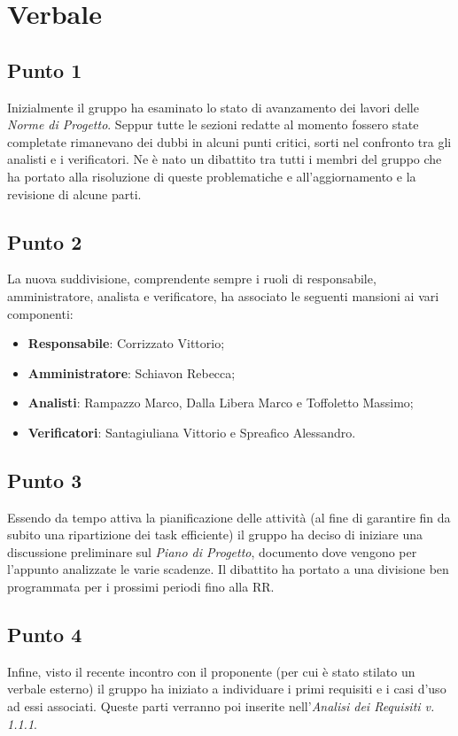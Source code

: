 \section{Verbale}
    \subsection{Punto 1}
        Inizialmente il gruppo ha esaminato lo stato di avanzamento dei lavori delle \textit{Norme di Progetto}. Seppur tutte le sezioni redatte al momento fossero state completate rimanevano dei dubbi in alcuni punti critici, sorti nel confronto tra gli analisti e i verificatori. Ne è nato un dibattito tra tutti i membri del gruppo che ha portato alla risoluzione di queste problematiche e all'aggiornamento e la revisione di alcune parti. 
    \subsection{Punto 2}
        La nuova suddivisione, comprendente sempre i ruoli di responsabile, amministratore, analista e verificatore, ha associato le seguenti mansioni ai vari componenti:
        \begin{itemize}
            \item \textbf{Responsabile}: Corrizzato Vittorio;
            \item \textbf{Amministratore}: Schiavon Rebecca;
            \item \textbf{Analisti}: Rampazzo Marco, Dalla Libera Marco e Toffoletto Massimo;
            \item \textbf{Verificatori}: Santagiuliana Vittorio e Spreafico Alessandro.
        \end{itemize}
    \subsection{Punto 3}
        Essendo da tempo attiva la pianificazione delle attività (al fine di garantire fin da subito una ripartizione dei task efficiente) il gruppo ha deciso di iniziare una discussione preliminare sul \textit{Piano di Progetto}, documento dove vengono per l'appunto analizzate le varie scadenze. Il dibattito ha portato a una divisione ben programmata per i prossimi periodi fino alla RR.
    \subsection{Punto 4}
        Infine, visto il recente incontro con il proponente (per cui è stato stilato un verbale esterno) il gruppo ha iniziato a individuare i primi requisiti e i casi d'uso ad essi associati. Queste parti verranno poi inserite nell'\textit{Analisi dei Requisiti v. 1.1.1}.